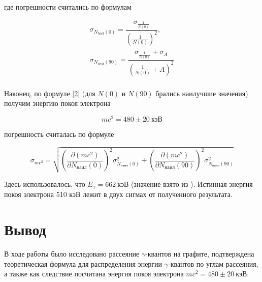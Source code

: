 \documentclass[15pt,a5paper,reqno]{article}
\begin{document}
где погрешности считались по формулам
 
\[
\begin{array}{l}
\sigma_{N_{\text{best}}(0)} = \dfrac{\sigma_{\frac{1}{N(0)}}}{(\frac{1}{N(0)})^2},\\[14pt]
\sigma_{N_{\text{best}}(90)} = \dfrac{\sigma_{\frac{1}{N(0)}} + \sigma_{A}}{(\frac{1}{N(0)}+A)^2} \\
\end{array}
\]

Наконец, по формуле \eqref{2} (для $N(0)$ и $N(90)$ брались наилучшие значения) получим энергию покоя электрона
    
    \[ mc^2 = 480 \pm 20~\text{кэВ} \]

погрешность считалась по формуле

\[\sigma_{mc^2} = \sqrt{ \left( \dfrac{\partial (mc^2)}{\partial N_{\text{наил}}(0)} \right)^2 \sigma_{N_{\text{наил}}(0)}^2 +\left( \dfrac{\partial (mc^2)}{\partial N_{\text{наил}}(90)} \right)^2 \sigma_{N_{\text{наил}}(90)}^2 }\]

Здесь использовалось, что $E_\gamma = 662~\text{кэВ}$ (значение взято из \cite{laba}). Истинная энергия покоя электрона 510 кэВ лежит в двух сигмах от полученного результата.

\section{Вывод}

В ходе работы было исследовано рассеяние $\gamma$-квантов на графите, подтверждена теоретическая формула для распределения энергии $\gamma$-квантов по углам рассеяния, а также как следствие посчитана энергия покоя электрона $mc^2 = 480 \pm 20 ~\text{кэВ}$.
\end{document}
